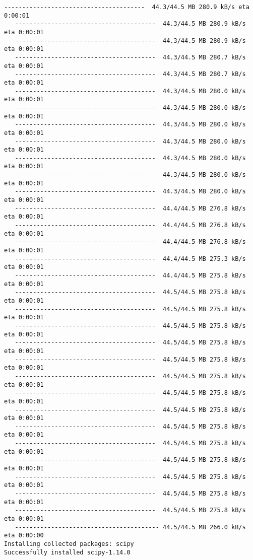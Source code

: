 \documentclass[11pt]{article}
\begin{document}
\begin{Verbatim}[commandchars=\\\{\}]
   ---------------------------------------  44.3/44.5 MB 280.9 kB/s eta 0:00:01
   ---------------------------------------  44.3/44.5 MB 280.9 kB/s eta 0:00:01
   ---------------------------------------  44.3/44.5 MB 280.9 kB/s eta 0:00:01
   ---------------------------------------  44.3/44.5 MB 280.7 kB/s eta 0:00:01
   ---------------------------------------  44.3/44.5 MB 280.7 kB/s eta 0:00:01
   ---------------------------------------  44.3/44.5 MB 280.0 kB/s eta 0:00:01
   ---------------------------------------  44.3/44.5 MB 280.0 kB/s eta 0:00:01
   ---------------------------------------  44.3/44.5 MB 280.0 kB/s eta 0:00:01
   ---------------------------------------  44.3/44.5 MB 280.0 kB/s eta 0:00:01
   ---------------------------------------  44.3/44.5 MB 280.0 kB/s eta 0:00:01
   ---------------------------------------  44.3/44.5 MB 280.0 kB/s eta 0:00:01
   ---------------------------------------  44.3/44.5 MB 280.0 kB/s eta 0:00:01
   ---------------------------------------  44.4/44.5 MB 276.8 kB/s eta 0:00:01
   ---------------------------------------  44.4/44.5 MB 276.8 kB/s eta 0:00:01
   ---------------------------------------  44.4/44.5 MB 276.8 kB/s eta 0:00:01
   ---------------------------------------  44.4/44.5 MB 275.3 kB/s eta 0:00:01
   ---------------------------------------  44.4/44.5 MB 275.8 kB/s eta 0:00:01
   ---------------------------------------  44.5/44.5 MB 275.8 kB/s eta 0:00:01
   ---------------------------------------  44.5/44.5 MB 275.8 kB/s eta 0:00:01
   ---------------------------------------  44.5/44.5 MB 275.8 kB/s eta 0:00:01
   ---------------------------------------  44.5/44.5 MB 275.8 kB/s eta 0:00:01
   ---------------------------------------  44.5/44.5 MB 275.8 kB/s eta 0:00:01
   ---------------------------------------  44.5/44.5 MB 275.8 kB/s eta 0:00:01
   ---------------------------------------  44.5/44.5 MB 275.8 kB/s eta 0:00:01
   ---------------------------------------  44.5/44.5 MB 275.8 kB/s eta 0:00:01
   ---------------------------------------  44.5/44.5 MB 275.8 kB/s eta 0:00:01
   ---------------------------------------  44.5/44.5 MB 275.8 kB/s eta 0:00:01
   ---------------------------------------  44.5/44.5 MB 275.8 kB/s eta 0:00:01
   ---------------------------------------  44.5/44.5 MB 275.8 kB/s eta 0:00:01
   ---------------------------------------  44.5/44.5 MB 275.8 kB/s eta 0:00:01
   ---------------------------------------  44.5/44.5 MB 275.8 kB/s eta 0:00:01
   ---------------------------------------- 44.5/44.5 MB 266.0 kB/s eta 0:00:00
Installing collected packages: scipy
Successfully installed scipy-1.14.0
    \end{Verbatim}
\end{document}
